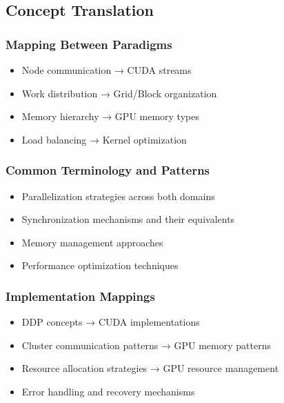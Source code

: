 \subsection{Concept Translation}
\label{sec:concept_translation}

\subsubsection{Mapping Between Paradigms}
\begin{itemize}
    \item Node communication → CUDA streams
    \item Work distribution → Grid/Block organization
    \item Memory hierarchy → GPU memory types
    \item Load balancing → Kernel optimization
\end{itemize}

\subsubsection{Common Terminology and Patterns}
\begin{itemize}
    \item Parallelization strategies across both domains
    \item Synchronization mechanisms and their equivalents
    \item Memory management approaches
    \item Performance optimization techniques
\end{itemize}

\subsubsection{Implementation Mappings}
\begin{itemize}
    \item DDP concepts → CUDA implementations
    \item Cluster communication patterns → GPU memory patterns
    \item Resource allocation strategies → GPU resource management
    \item Error handling and recovery mechanisms
\end{itemize}

